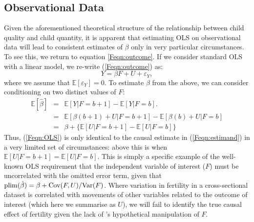 \subsection{Observational Data}
Given the aforementioned theoretical structure of the relationship between 
child quality and child quantity, it is apparent that estimating OLS on 
observational data will lead to consistent estimates of $\beta$ only in very
particular circumstances. To see this, we return to equation \ref{Feqn:outcome}.
If we consider standard OLS with a linear model, we re-write 
(\ref{Feqn:outcome}) as:
\[
Y=\beta F + U + \varepsilon_Y,
\]
where we assume that $\mathbb{E}[\varepsilon_Y]=0$.  To estimate $\beta$ from
the above, we can consider conditioning on two distinct values of $F$:
\begin{eqnarray}
\mathbb{E}[\hat\beta] & = & \mathbb{E}[Y|F=b+1]-\mathbb{E}[Y|F=b]. \label{Feqn:OLS} \\
                      & = & \mathbb{E}[\beta(b+1)+U|F=b+1] - \mathbb{E}[\beta(b)+U|F=b] 
\nonumber \\
                      & = & \beta + \{\mathbb{E}[U|F=b+1] - \mathbb{E}[U|F=b]\} \nonumber
\end{eqnarray}
Thus, (\ref{Feqn:OLS}) is only identical to the causal estimate in 
(\ref{Feqn:estimand}) in a very limited set of circumstances: above this is when
$\mathbb{E}[U|F=b+1] = \mathbb{E}[U|F=b]$.  This is simply a specific example of 
the well-known OLS requirement that the independent variable of interest ($F$) 
must be uncorrelated with the omitted error term, given that 
$\operatorname{plim}(\hat\beta)=\beta+\mathrm{Cov}(F,U)/\mathrm{Var}(F)$.  Where variation in fertility
in a cross-sectional dataset is correlated with movements of other variables
related to the outcome of interest (which here we summarise as $U$), we will fail 
to identify the true causal effect of fertility given the lack of 
\citeauthor{Haavelmo1943}'s hypothetical manipulation of $F$. 

